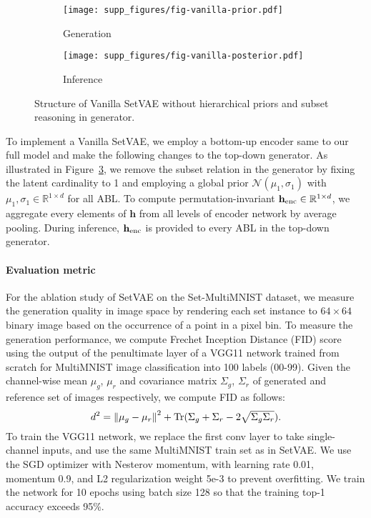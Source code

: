 \documentclass[final]{arxiv/cvpr}
\begin{document}
\begin{figure}[!t]
    \centering
    \begin{subfigure}[b]{0.395\linewidth}
        \centering
        \texttt{[image: supp\_figures/fig-vanilla-prior.pdf]}
        \caption{Generation}
        \label{fig:vanilla_prior}
    \end{subfigure}
    \begin{subfigure}[b]{0.59\linewidth}
        \centering
        \texttt{[image: supp\_figures/fig-vanilla-posterior.pdf]}
        \caption{Inference}
        \label{fig:vanilla_posterior}
    \end{subfigure}
    \caption{Structure of Vanilla SetVAE without hierarchical priors and subset reasoning in generator.}
\label{fig:vanilla_setvae}
\end{figure}
To implement a Vanilla SetVAE, we employ a bottom-up encoder same to our full model and make the following changes to the top-down generator.
As illustrated in Figure~\ref{fig:vanilla_setvae}, we remove the subset relation in the generator by fixing the latent cardinality to 1 and employing a global prior $\mathcal{N}(\mu_1, \sigma_1)$ with $\mu_1, \sigma_1 \in \mathbb{R}^{1\times d}$ for all ABL.
To compute permutation-invariant $\mathbf{h}_{\textnormal{enc}} \in \mathbb{R}^{1\times d}$,
we aggregate every elements of $\mathbf{h}$ from all levels of encoder network by average pooling.
During inference, $\mathbf{h}_{\textnormal{enc}}$ is provided to every ABL in the top-down generator.

\paragraph{Evaluation metric}
For the ablation study of SetVAE on the Set-MultiMNIST dataset, we measure the generation quality in image space by rendering each set instance to $64\times 64$ binary image based on the occurrence of a point in a pixel bin.
To measure the generation performance, we compute Frechet Inception Distance (FID) score \cite{heusel2017gans} using the output of the penultimate layer of a VGG11 network trained from scratch for MultiMNIST image classification into 100 labels (00-99).
Given the channel-wise mean $\mu_g$, $\mu_r$ and covariance matrix $\Sigma_g$, $\Sigma_r$ of generated and reference set of images respectively, we compute FID as follows:
\begin{equation}
    d^2 = {\| \mu_g - \mu_r \|}^2 + \textnormal{Tr} (\Sigma_g + \Sigma_r - 2 \sqrt{\Sigma_g \Sigma_r}).
\end{equation}
To train the VGG11 network, we replace the first conv layer to take single-channel inputs, and use the same MultiMNIST train set as in SetVAE.
We use the SGD optimizer with Nesterov momentum, with learning rate 0.01, momentum 0.9, and L2 regularization weight 5e-3 to prevent overfitting.
We train the network for 10 epochs using batch size 128 so that the training top-1 accuracy exceeds 95\%.
\end{document}
